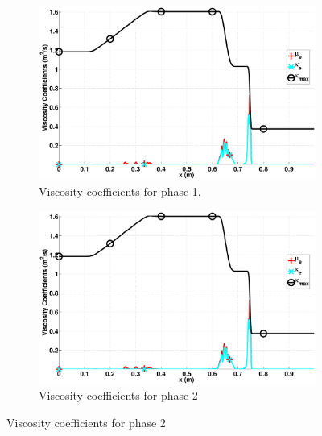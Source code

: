 \documentclass[preprint,10pt]{elsarticle}
\begin{document}
%
\begin{figure}[H]
        \centering
        \begin{subfigure}[b]{0.495\textwidth}
                \centering
                \includegraphics[width=\textwidth]{figures/two_phases_vapor_viscosity_kappa_mu.eps}
                \caption{Viscosity coefficients for phase 1.}
                \label{fig:indp-phase-1}
        \end{subfigure}%
        \begin{subfigure}[b]{0.495\textwidth}
                \centering
                \includegraphics[width=\textwidth]{figures/two_phases_vapor_viscosity_kappa_mu.eps}
                \caption{Viscosity coefficients for phase 2}
                \label{fig:indp-phase-2}
        \end{subfigure}
        

\end{figure}
\end{document}
